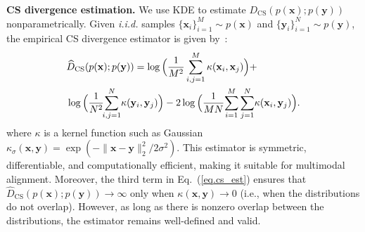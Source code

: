 \textbf{CS divergence estimation.} 
We use KDE to estimate \(D_{\text{CS}}(p(\mathbf{x}); p(\mathbf{y}))\) nonparametrically. 
Given \textit{i.i.d.} samples \(\{\mathbf{x}_i\}_{i=1}^M\sim p(\mathbf{x}) \) and \(\{\mathbf{y}_i\}_{i=1}^N \sim p(\mathbf{y})\), the empirical CS divergence estimator is given by~\citep{jenssen2006cauchy}:
\begin{equation}
\label{eq.cs_est}
\begin{aligned}
& \widehat{D}_{\text{CS}} (p(\mathbf{x});p(\mathbf{y})) = \log \Big(\frac{1}{M^2}\sum_{i,j=1}^M \kappa({\mathbf x}_i,{\mathbf x}_j)\Big) +  \\ & \log\Big(\frac{1}{N^2}\!\!\sum_{i,j=1}^N \!\kappa({\bf y}_i,{\mathbf y}_j)\Big) 
-2 \log\Big(\frac{1}{MN}\!\sum_{i=1}^M \sum_{j=1}^N\! \kappa({\mathbf x}_i,{\mathbf y}_j)\Big).
\end{aligned}
\end{equation}
where $\kappa$ is a kernel function such as Gaussian $\kappa_{\sigma}(\mathbf{x},\mathbf{y})=\exp(-\|\mathbf{x}-\mathbf{y}\|_2^2/2\sigma^2)$.  
This estimator is symmetric, differentiable, and computationally efficient, making it suitable for multimodal alignment. Moreover, the third term in Eq.~(\ref{eq.cs_est}) ensures that \(\widehat{D}_{\text{CS}}(p(\mathbf{x}); p(\mathbf{y})) \to \infty\) only when \(\kappa({\mathbf x}, {\mathbf y}) \to 0\) (i.e., when the distributions do not overlap). However, as long as there is nonzero overlap between the distributions, the estimator remains well-defined and valid.   


